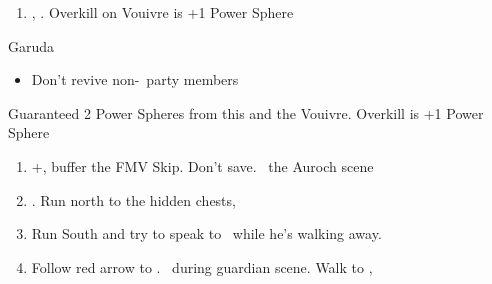 \begin{enumerate}[resume]
    \item \sd, \skippablefmv. Overkill on Vouivre is +1 Power Sphere
\end{enumerate}
\begin{battle}[1800]{Garuda}
    \begin{itemize}
        \tidusf Haste \auron
        \auronf Attack x3
        \wakkaf Defend, Potion if \tidus\ has less than 312 HP
        \tidusf Attack x1, then Defend
        \wakkaf Defend, Potion if \auron\ has less than 202 HP
        \auronf Attack x3
        \item Don't revive non-\auron\ party members
    \end{itemize}
    Guaranteed 2 Power Spheres from this and the Vouivre. Overkill is +1 Power Sphere
\end{battle}
\begin{enumerate}[resume]
    \item \cs+\skippablefmv[1:30], buffer the FMV Skip. Don't save. \sd\ the Auroch scene
    \item \cs[4:50]. Run north to the hidden chests, 
    \item Run South and try to speak to \auron\ while he's walking away.
    \item Follow red arrow to \yuna. \sd\ during guardian scene. Walk to \yuna, \cs[4:20]
\end{enumerate}
